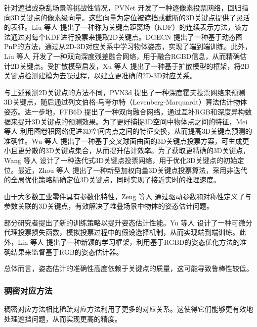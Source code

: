\par 针对遮挡或杂乱场景等挑战性情况，PVNet\cite{peng2019pvnet} 开发了一种逐像素投票网络，回归指向3D关键点的像素级向量。这些向量为定位被遮挡或截断的3D关键点提供了灵活的表征。Liu 等人\cite{liu2021kdfnet} 提出了一种称为关键点距离场（KDF）的连续表示方法，该方法通过对每个KDF进行投票来提取2D关键点。DGECN\cite{cao2022dgecn} 提出了一种基于动态图PnP\cite{RANSAC}的方法，通过从2D-3D对应关系中学习物体姿态，实现了端到端训练。此外，Liu 等人\cite{liu2023bdr6d} 开发了一种双向深度残差融合网络，用于融合RGBD信息，从而精确估计2D关键点。受扩散模型启发，Xu 等人\cite{xu20246ddiff} 提出了一种基于扩散模型的框架，将2D关键点检测建模为去噪过程，以建立更准确的2D-3D对应关系。

\par 与上述预测2D关键点的方法不同，PVN3d\cite{he2020pvn3d} 提出了一种深度霍夫投票网络来预测3D关键点，随后通过列文伯格-马夸尔特（Levenberg-Marquardt）算法\cite{Levenberg_Marquardt}估计物体姿态。进一步地，FFB6D\cite{he2021ffb6d} 提出了一种双向融合网络，通过互补RGB和深度异构数据来提升3D关键点的预测效果。为了更好捕捉3D空间中物体点之间的特征，Mei 等人\cite{mei2022spatial} 利用图卷积网络促进3D空间内点之间的特征交换，从而提高3D关键点预测的准确性。Wu 等人\cite{wu2022vote} 提出了一种基于交叉球面曲面的3D关键点投票方案，可生成更小且更分散的3D关键点集合，从而提升估计效率。为了获取更精确的3D关键点，Wang 等人\cite{wang2023kvnet} 设计了一种迭代式3D关键点投票网络，用于优化3D关键点的初始定位。最近，Zhou 等人\cite{zhou2023deep} 提出了一种新型加权向量3D关键点投票算法，采用非迭代的全局优化策略精确定位3D关键点，同时实现了接近实时的推理速度。

\par 由于大多数工业零件具有参数化特性，Zeng 等人\cite{zeng2021parametricnet} 通过驱动参数和对称性定义了与参数关联的3D关键点，有效解决了堆叠场景中物体的姿态估计问题。

\par 部分研究者提出了新的训练策略以提升姿态估计性能。Yu 等人\cite{yu20206dof} 设计了一种可微分代理投票损失函数，模拟投票过程中的假设选择机制，从而实现端到端训练。此外，Lin 等人\cite{lin2022learning} 提出了一种新颖的学习框架，利用基于RGBD的姿态优化方法的准确结果来监督基于RGB的姿态估计器。

总体而言，姿态估计的准确性高度依赖于关键点的质量，这可能导致鲁棒性较低。

\subsubsection{稠密对应方法}\label{稠密对应方法}
\par 稠密对应方法相比稀疏对应方法利用了更多的对应关系。这使得它们能够更有效地处理遮挡问题，从而实现更高的精度。

